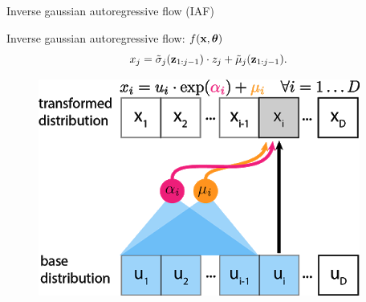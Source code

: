 \begin{frame}{Inverse gaussian autoregressive flow (IAF)}
	\begin{minipage}[t]{0.65\columnwidth}
		\begin{block}{Inverse gaussian autoregressive flow: $f(\mathbf{x}, \boldsymbol{\theta})$}
			\vspace{-0.3cm}
			\[
				x_j = \tilde{\sigma}_j (\mathbf{z}_{1:j-1}) \cdot z_j + \tilde{\mu}_j(\mathbf{z}_{1:j-1}).
			\]
		\end{block}
	\end{minipage}%
	\begin{minipage}[t]{0.35\columnwidth}
		\begin{figure}[h]
			\centering
			\includegraphics[width=.9\linewidth]{figs/af_iaf_explained_3.png}
		\end{figure}
	\end{minipage}
	
\end{frame}
